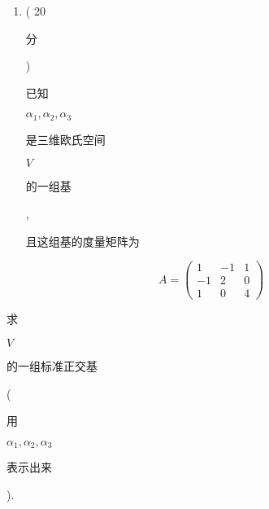 \documentclass[10pt]{article}
\begin{document}
\begin{enumerate}
  \item ( 20 \begin{CJK}{UTF8}{mj}分\end{CJK}) \begin{CJK}{UTF8}{mj}已知\end{CJK} $\alpha_{1}, \alpha_{2}, \alpha_{3}$ \begin{CJK}{UTF8}{mj}是三维欧氏空间\end{CJK} $V$ \begin{CJK}{UTF8}{mj}的一组基\end{CJK}, \begin{CJK}{UTF8}{mj}且这组基的度量矩阵为\end{CJK}

\end{enumerate}
$$
A=\left(\begin{array}{ccc}
1 & -1 & 1 \\
-1 & 2 & 0 \\
1 & 0 & 4
\end{array}\right)
$$
\begin{CJK}{UTF8}{mj}求\end{CJK} $V$ \begin{CJK}{UTF8}{mj}的一组标准正交基\end{CJK} (\begin{CJK}{UTF8}{mj}用\end{CJK} $\alpha_{1}, \alpha_{2}, \alpha_{3}$ \begin{CJK}{UTF8}{mj}表示出来\end{CJK}).
\end{document}

